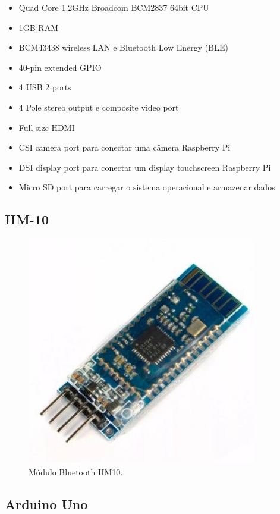 \documentclass[
	12pt,				%
	oneside,			%
	a4paper,			%
	brazil				%
]{abntex2}
\begin{document}
\begin{itemize}
\item Quad Core 1.2GHz Broadcom BCM2837 64bit CPU
\item 1GB RAM
\item BCM43438 wireless LAN e Bluetooth Low Energy (BLE)
\item 40-pin extended GPIO
\item 4 USB 2 ports
\item 4 Pole stereo output e composite video port
\item Full size HDMI
\item CSI camera port para conectar uma câmera Raspberry Pi
\item DSI display port para conectar um display touchscreen Raspberry Pi
\item Micro SD port para carregar o sistema operacional e armazenar dados
\end{itemize}


\subsection{HM-10}

\begin{figure}[!h]
\centering
\includegraphics[width=10cm, center]{images/hm-10}
\caption{Módulo Bluetooth HM10.}
\label{Rotulo}
\end{figure}

\newpage

\subsection{Arduino Uno}
\end{document}
